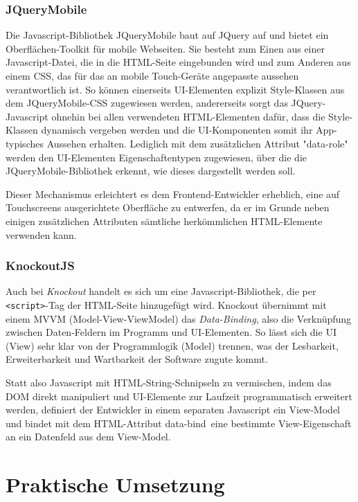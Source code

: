 \documentclass{scrreprt}
\begin{document}
\subsection{JQueryMobile}
Die Javascript-Bibliothek JQueryMobile baut auf JQuery auf und bietet ein Oberflächen-Toolkit für mobile Webseiten. Sie besteht zum Einen aus einer Javascript-Datei, die in die HTML-Seite eingebunden wird und zum Anderen aus einem CSS, das für das an mobile Touch-Geräte angepasste aussehen verantwortlich ist. 
So können einerseits UI-Elementen explizit Style-Klassen aus dem JQueryMobile-CSS zugewiesen werden, andererseits sorgt das JQuery-Javascript ohnehin bei allen verwendeten HTML-Elementen dafür, dass die Style-Klassen dynamisch vergeben werden und die UI-Komponenten somit ihr App-typisches Aussehen erhalten.
Lediglich mit dem zusätzlichen Attribut "data-role" werden den UI-Elementen Eigenschaftentypen zugewiesen, über die die JQueryMobile-Bibliothek erkennt, wie dieses dargestellt werden soll.

Dieser Mechanismus erleichtert es dem Frontend-Entwickler erheblich, eine auf Touchscreens ausgerichtete Oberfläche zu entwerfen, da er im Grunde neben einigen zusätzlichen Attributen sämtliche herkömmlichen HTML-Elemente verwenden kann. 

\subsection{KnockoutJS}
Auch bei \emph{Knockout} handelt es sich um eine Javascript-Bibliothek, die per \mbox{\texttt{<script>}-Tag} der HTML-Seite hinzugefügt wird. Knockout übernimmt mit einem MVVM (Model-View-ViewModel) das \emph{Data-Binding}, also die Verknüpfung zwischen Daten-Feldern im Programm und UI-Elementen.
So lässt sich die UI (View) sehr klar von der Programmlogik (Model) trennen, was der Lesbarkeit, Erweiterbarkeit und Wartbarkeit der Software zugute kommt.

Statt also Javascript mit HTML-String-Schnipseln zu vermischen, indem das DOM direkt manipuliert und UI-Elemente zur Laufzeit
programmatisch erweitert werden, definiert der Entwickler in einem separaten Javascript ein View-Model und bindet mit dem HTML-Attribut \glqq data-bind\grqq \ eine bestimmte View-Eigenschaft an ein Datenfeld aus dem View-Model.


\chapter{Praktische Umsetzung}
\end{document}
